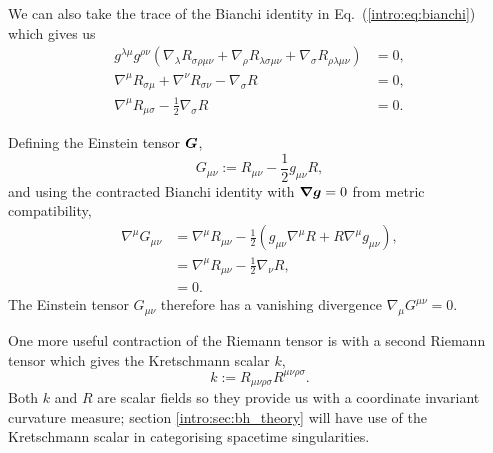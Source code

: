 We can also take the trace of the Bianchi identity in Eq.~(\ref{intro:eq:bianchi}) which gives us 
\begin{align}
g^{\lambda\mu}g^{\rho\nu} (\nabla_\lambda R_{\sigma\rho\mu\nu} + \nabla_\rho R_{\lambda\sigma\mu\nu} + \nabla_\sigma R_{\rho\lambda\mu\nu}) &= 0 , \\
 \nabla^\mu R_{\sigma\mu} + \nabla^\nu R_{\sigma\nu} - \nabla_\sigma R &= 0 , \\
 \nabla^\mu R_{\mu\sigma} - \frac{1}{2}\nabla_\sigma R&=0.
\end{align}

Defining the Einstein tensor $\boldsymbol{G}$,
\begin{equation}
G_{\mu\nu} := R_{\mu\nu} - \frac{1}{2}g_{\mu\nu}R, 
\end{equation}
and using the contracted Bianchi identity with $\boldsymbol{\nabla}\boldsymbol{g}=0$ from metric compatibility,
\begin{align}
\nabla^\mu G_{\mu\nu} &= \nabla^\mu R_{\mu\nu} - \frac{1}{2}\left(g_{\mu\nu}\nabla^\mu R + R\nabla^\mu g_{\mu\nu}\right) ,\\
&= \nabla^\mu R_{\mu\nu} - \frac{1}{2}\nabla_\nu R  ,\label{intro:eq:einstein_tensor_div}\\
&=0.
\end{align}
The Einstein tensor $G_{\mu\nu}$ therefore has a vanishing divergence $\nabla_\mu G^{\mu\nu}=0$.

One more useful contraction of the Riemann tensor is with a second Riemann tensor which gives the Kretschmann scalar $k$,
\begin{equation} \label{intro:eq:Kretschdef}
k := R_{\mu\nu\rho\sigma}R^{\mu\nu\rho\sigma}.
\end{equation}
Both $k$ and $R$ are scalar fields so they provide us with a coordinate invariant curvature measure; section \ref{intro:sec:bh_theory} will have use of the Kretschmann scalar in categorising spacetime singularities.





